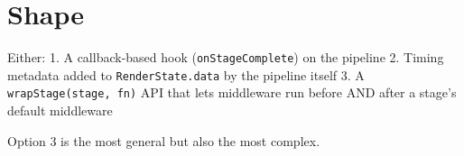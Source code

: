 \section{Shape}\label{record-363-shape}

Either: 1. A callback-based hook (\texttt{o\allowbreak{}n\allowbreak{}S\allowbreak{}t\allowbreak{}a\allowbreak{}g\allowbreak{}e\allowbreak{}C\allowbreak{}o\allowbreak{}m\allowbreak{}p\allowbreak{}l\allowbreak{}e\allowbreak{}t\allowbreak{}e}) on the pipeline 2. Timing metadata added to \texttt{R\allowbreak{}e\allowbreak{}n\allowbreak{}d\allowbreak{}e\allowbreak{}r\allowbreak{}S\allowbreak{}t\allowbreak{}a\allowbreak{}t\allowbreak{}e\allowbreak{}.\allowbreak{}d\allowbreak{}a\allowbreak{}t\allowbreak{}a} by the pipeline itself 3. A \texttt{w\allowbreak{}r\allowbreak{}a\allowbreak{}p\allowbreak{}S\allowbreak{}t\allowbreak{}a\allowbreak{}g\allowbreak{}e\allowbreak{}(\allowbreak{}s\allowbreak{}t\allowbreak{}a\allowbreak{}g\allowbreak{}e\allowbreak{},\allowbreak{} \allowbreak{}f\allowbreak{}n\allowbreak{})} API that lets middleware run before AND after a stage's default middleware

Option 3 is the most general but also the most complex.

